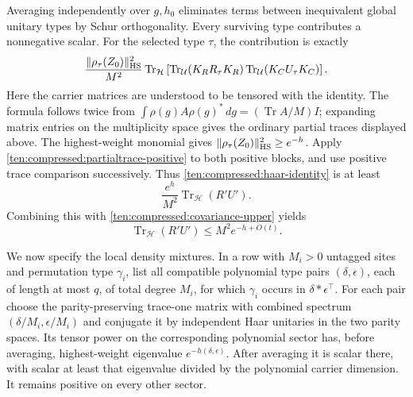 Averaging independently over $g,h_0$ eliminates terms between inequivalent global unitary types by Schur orthogonality. Every surviving type contributes a nonnegative scalar. For the selected type $\tau$, the contribution is exactly
\begin{equation}
\label{ten:compressed:haar-identity}
 \frac{\|\rho_\tau(Z_0)\|_{\rm HS}^2}{M^2}
 \operatorname{Tr}_{\mathcal H}
 \left[
  \operatorname{Tr}_{\mathcal U}(K_R R_\tau K_R)
  \operatorname{Tr}_{\mathcal U}(K_C U_\tau K_C)
 \right].
\end{equation}
Here the carrier matrices are understood to be tensored with the identity. The formula follows twice from
$\int\rho(g)A\rho(g)^*\,dg=(\operatorname{Tr}A/M)I$;
expanding matrix entries on the multiplicity space gives the ordinary partial traces displayed above. The highest-weight monomial gives
$\|\rho_\tau(Z_0)\|_{\rm HS}^2\ge e^{-h}$.
Apply \eqref{ten:compressed:partialtrace-positive} to both positive blocks, and use positive trace comparison successively. Thus \eqref{ten:compressed:haar-identity} is at least
\[
 \frac{e^h}{M^2}\operatorname{Tr}_{\mathcal H}(R'U').
\]
Combining this with \eqref{ten:compressed:covariance-upper} yields
\begin{equation}
\label{ten:compressed:partialtrace-overlap}
 \operatorname{Tr}_{\mathcal H}(R'U')
       \le M^2e^{-h+O(t)}.
\end{equation}

We now specify the local density mixtures. In a row with $M_i>0$ untagged sites and permutation type $\gamma_i$, list all compatible polynomial type pairs $(\delta,\epsilon)$, each of length at most $q$, of total degree $M_i$, for which $\gamma_i$ occurs in $\delta*\epsilon^\top$. For each pair choose the parity-preserving trace-one matrix with combined spectrum $(\delta/M_i,\epsilon/M_i)$ and conjugate it by independent Haar unitaries in the two parity spaces. Its tensor power on the corresponding polynomial sector has, before averaging, highest-weight eigenvalue $e^{-h(\delta,\epsilon)}$. After averaging it is scalar there, with scalar at least that eigenvalue divided by the polynomial carrier dimension. It remains positive on every other sector.

